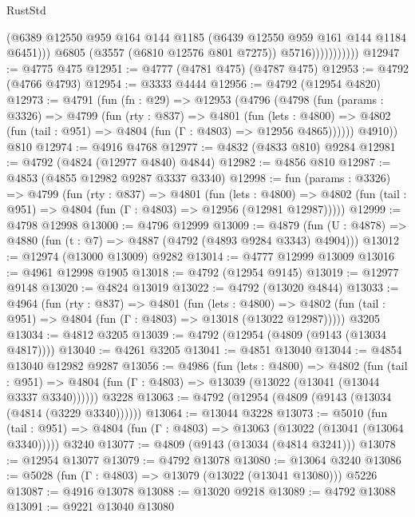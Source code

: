\begin{lexlean}{RustStd}
\begin{coremodule}
                            (@6389
                              @12550
                              @959
                              @164
                              @144
                              @1185
                              (@6439 @12550 @959 @161 @144 @1184 @6451)))
                          @6805
                          (@3557 (@6810 @12576 @801 @7275))
                          @5716)))))))))))
@12947 := @4775 @475
@12951 := @4777 (@4781 @475) (@4787 @475)
@12953 := @4792 (@4766 @4793)
@12954 := @3333 @4444
@12956 := @4792 (@12954 @4820)
@12973 := @4791
    (fun (fn : @29) =>
    @12953
      (@4796
        (@4798
          (fun (params : @3326) =>
          @4799
            (fun (rty : @837) =>
            @4801
              (fun (lets : @4800) =>
              @4802 (fun (tail : @951) => @4804 (fun (Γ : @4803) => @12956 @4865))))))
        @4910))
    @810
@12974 := @4916 @4768
@12977 := @4832 (@4833 @810) @9284
@12981 := @4792 (@4824 (@12977 @4840) @4844)
@12982 := @4856 @810
@12987 := @4853 (@4855 @12982 @9287 @3337 @3340)
@12998 := fun (params : @3326) =>
  @4799
    (fun (rty : @837) =>
    @4801
      (fun (lets : @4800) =>
      @4802 (fun (tail : @951) => @4804 (fun (Γ : @4803) => @12956 (@12981 @12987)))))
@12999 := @4798 @12998
@13000 := @4796 @12999
@13009 := @4879 (fun (U : @4878) => @4880 (fun (t : @7) => @4887 (@4792 (@4893 @9284 @3343) @4904)))
@13012 := @12974 (@13000 @13009) @9282
@13014 := @4777 @12999 @13009
@13016 := @4961 @12998 @1905
@13018 := @4792 (@12954 @9145)
@13019 := @12977 @9148
@13020 := @4824 @13019
@13022 := @4792 (@13020 @4844)
@13033 := @4964
    (fun (rty : @837) =>
    @4801
      (fun (lets : @4800) =>
      @4802 (fun (tail : @951) => @4804 (fun (Γ : @4803) => @13018 (@13022 @12987)))))
    @3205
@13034 := @4812 @3205
@13039 := @4792 (@12954 (@4809 (@9143 (@13034 @4817))))
@13040 := @4261 @3205
@13041 := @4851 @13040
@13044 := @4854 @13040 @12982 @9287
@13056 := @4986
    (fun (lets : @4800) =>
    @4802
      (fun (tail : @951) =>
      @4804 (fun (Γ : @4803) => @13039 (@13022 (@13041 (@13044 @3337 @3340))))))
    @3228
@13063 := @4792 (@12954 (@4809 (@9143 (@13034 (@4814 (@3229 @3340))))))
@13064 := @13044 @3228
@13073 := @5010
    (fun (tail : @951) => @4804 (fun (Γ : @4803) => @13063 (@13022 (@13041 (@13064 @3340)))))
    @3240
@13077 := @4809 (@9143 (@13034 (@4814 @3241)))
@13078 := @12954 @13077
@13079 := @4792 @13078
@13080 := @13064 @3240
@13086 := @5028 (fun (Γ : @4803) => @13079 (@13022 (@13041 @13080))) @5226
@13087 := @4916 @13078
@13088 := @13020 @9218
@13089 := @4792 @13088
@13091 := @9221 @13040 @13080

\end{coremodule}
\end{lexlean}
